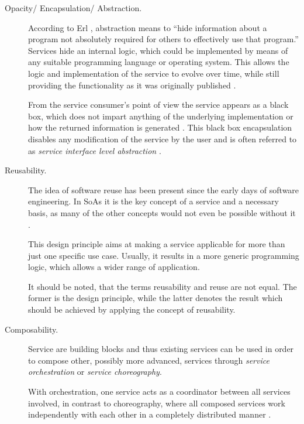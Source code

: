 \begin{description}
\item [Opacity/ Encapsulation/ Abstraction.]
According to Erl \cite[ch.8.1.]{erl2008}, abstraction means to ``hide information about a program not absolutely required for others to effectively use that program.'' 
Services hide an internal logic, which could be implemented by means of any suitable programming language or operating system. This allows the logic and implementation of the service to evolve over time, while still providing the functionality as it was originally published \cite[ch.8.1]{erl2008}.

From the service consumer's point of view the service appears as a black box, which does not impart anything of the underlying implementation or how the returned information is generated \cite{opengroup} \cite{breivold} \cite{arrowhead} \cite[p.27]{erl2011}. This black box encapsulation disables any modification of the service by the user and is often referred to as \emph{service interface level abstraction} \cite{breivold}.

\item [Reusability.]
The idea of software reuse has been present since the early days of software engineering. In SoAs it is the key concept of a service and a necessary basis, as many of the other concepts would not even be possible without it \cite[ch.9.1.]{erl2008} \cite[p.27]{erl2011}.

This design principle aims at making a service applicable for more than just one specific use case. Usually, it results in a more generic programming logic, which allows a wider range of application.

It should be noted, that the terms reusability and reuse are not equal. The former is the design principle, while the latter denotes the result which should be achieved by applying the concept of reusability.

\item [Composability.] 
Service are building blocks and thus existing services can be used in order to compose other, possibly more advanced, services through \emph{service orchestration} or \emph{service choreography}. 

With orchestration, one service acts as a coordinator between all services involved, in contrast to choreography, where all composed services work independently with each other in a completely distributed manner \cite{opengroup} \cite{arrowhead} \cite{breivold} \cite[p.27]{erl2011}.


\end{description}
